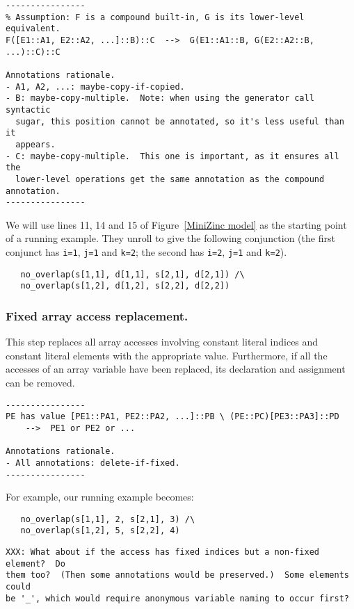 \documentclass[10pt]{article}
\begin{document}
\begin{verbatim}
----------------
% Assumption: F is a compound built-in, G is its lower-level equivalent.
F([E1::A1, E2::A2, ...]::B)::C  -->  G(E1::A1::B, G(E2::A2::B, ...)::C)::C

Annotations rationale.
- A1, A2, ...: maybe-copy-if-copied.
- B: maybe-copy-multiple.  Note: when using the generator call syntactic
  sugar, this position cannot be annotated, so it's less useful than it
  appears.
- C: maybe-copy-multiple.  This one is important, as it ensures all the
  lower-level operations get the same annotation as the compound annotation.
----------------
\end{verbatim}

We will use lines 11, 14 and 15 of Figure~\ref{MiniZinc model} as the
starting point of a running example.  They unroll to give the following
conjunction (the first conjunct has \texttt{i=1}, \texttt{j=1} and
\texttt{k=2}; the second has \texttt{i=2}, \texttt{j=1} and \texttt{k=2}).
\begin{verbatim}
   no_overlap(s[1,1], d[1,1], s[2,1], d[2,1]) /\
   no_overlap(s[1,2], d[1,2], s[2,2], d[2,2])
\end{verbatim}


\subsubsection{Fixed array access replacement.}
This step replaces all array accesses involving constant literal indices and
constant literal elements with the appropriate value.  Furthermore, if all
the accesses of an array variable have been replaced, its declaration and
assignment can be removed.  

\begin{verbatim}
----------------
PE has value [PE1::PA1, PE2::PA2, ...]::PB \ (PE::PC)[PE3::PA3]::PD
    -->  PE1 or PE2 or ...

Annotations rationale.
- All annotations: delete-if-fixed.
----------------
\end{verbatim}

For example, our running example becomes:
\begin{verbatim}
   no_overlap(s[1,1], 2, s[2,1], 3) /\
   no_overlap(s[1,2], 5, s[2,2], 4)
\end{verbatim}

\begin{verbatim}
XXX: What about if the access has fixed indices but a non-fixed element?  Do
them too?  (Then some annotations would be preserved.)  Some elements could
be '_', which would require anonymous variable naming to occur first?
\end{verbatim}
\end{document}

